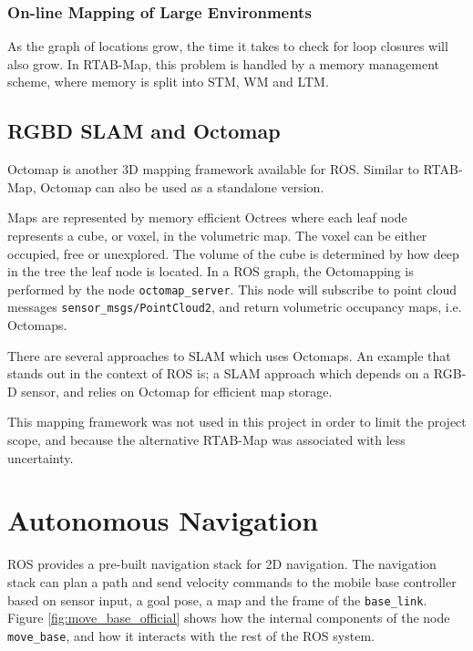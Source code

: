 \subsubsection{On-line Mapping of Large Environments}

As the graph of locations grow, the time it takes to check for loop closures will also grow. In \ac{RTAB-Map}, this problem is handled by a memory management scheme, where memory is split into \ac{STM}, \ac{WM} and \ac{LTM}.

\subsection{RGBD SLAM and Octomap}

Octomap\cite{hornung13auro} is another 3D mapping framework available for \ac{ROS}. Similar to \ac{RTAB-Map}, Octomap can also be used as a standalone version. 

Maps are represented by memory efficient Octrees where each leaf node represents a cube, or voxel, in the volumetric map. The voxel can be either occupied, free or unexplored. The volume of the cube is determined by how deep in the tree the leaf node is located. In a \ac{ROS} graph, the Octomapping is performed by the node \texttt{octomap\_server}. This node  will subscribe to point cloud messages \texttt{sensor\_msgs/PointCloud2}, and return volumetric occupancy maps, i.e. Octomaps.

There are several approaches to \ac{SLAM}  which uses Octomaps. An example that stands out in the context of \ac{ROS} is\cite{endres20143}; a \ac{SLAM} approach which depends on a RGB-D sensor, and relies on Octomap for efficient map storage.

This mapping framework was not used in this project in order to limit the project scope, and because the alternative \ac{RTAB-Map} was associated with less uncertainty.

\section{Autonomous Navigation}
\label{sec:navigation_theory}
\ac{ROS} provides a pre-built navigation stack for 2D navigation. The navigation stack can plan a path and send velocity commands to the mobile base controller based on sensor input, a goal pose, a map and the frame of the \texttt{base\_link}. Figure \ref{fig:move_base_official} shows how the internal components of the node \texttt{move\_base}, and how it interacts with the rest of the \ac{ROS} system. 

